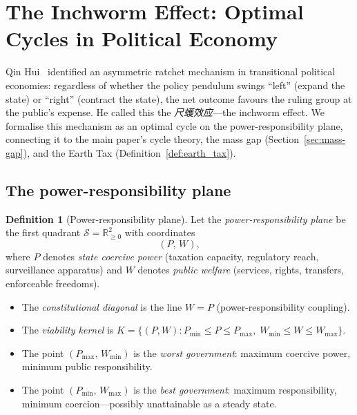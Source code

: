 \documentclass[11pt,a4paper]{article}
\theoremstyle{definition}
\newtheorem{definition}[theorem]{Definition}
\theoremstyle{remark}
\begin{document}
\section{The Inchworm Effect: Optimal Cycles in Political Economy}
\label{sec:inchworm}

Qin Hui~\cite{qinhui2003} identified an asymmetric ratchet mechanism
in transitional political economies: regardless of whether the policy
pendulum swings ``left'' (expand the state) or ``right'' (contract the
state), the net outcome favours the ruling group at the public's
expense.  He called this the \emph{尺蠖效应}---the inchworm effect.
We formalise this mechanism as an optimal cycle on the
power-responsibility plane, connecting it to the main paper's cycle
theory, the mass gap (Section~\ref{sec:mass-gap}), and the Earth Tax
(Definition~\ref{def:earth_tax}).

\subsection*{The power-responsibility plane}

\begin{definition}[Power-responsibility plane]\label{def:PW-plane}
Let the \emph{power-responsibility plane} be the first quadrant
$\mathcal{S} = \mathbb{R}^2_{\geq 0}$ with coordinates
\[
  (P,\, W),
\]
where $P$ denotes \emph{state coercive power} (taxation capacity,
regulatory reach, surveillance apparatus) and $W$ denotes
\emph{public welfare} (services, rights, transfers, enforceable
freedoms).

\begin{itemize}[nosep]
\item The \emph{constitutional diagonal} is the line $W = P$
  (power-responsibility coupling).
\item The \emph{viability kernel} is
  $K = \{(P,W) : P_{\min} \leq P \leq P_{\max},\;
  W_{\min} \leq W \leq W_{\max}\}$.
\item The point $(P_{\max},\, W_{\min})$ is the \emph{worst
  government}: maximum coercive power, minimum public responsibility.
\item The point $(P_{\min},\, W_{\max})$ is the \emph{best
  government}: maximum responsibility, minimum coercion---possibly
  unattainable as a steady state.
\end{itemize}
\end{definition}
\end{document}
